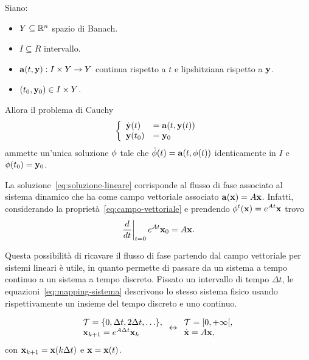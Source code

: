 \begin{thm}
    Siano:
    \begin{itemize}
        \item $Y \subseteq \mathbb{R}^n$ spazio di Banach.%
        \item $I \subseteq R$ intervallo.%
        \item $\mathbf{a}(t, \mathbf{y}) : I \times Y \to Y$ continua rispetto a $t$ e lipshitziana rispetto a $\mathbf{y}$.%
        \item $(t_0, \mathbf{y}_0) \in I \times Y$.
    \end{itemize}
    Allora il problema di Cauchy
    \begin{equation*}
        \left\{
            \begin{array}{ll}
                \dot{\mathbf{y}}(t) &= \mathbf{a}(t, \mathbf{y} (t)) \\
                \mathbf{y} (t_0) &= \mathbf{y}_0
            \end{array}
        \right.
    \end{equation*}
    ammette un'unica soluzione $\mathbf{\phi}$ tale che $\dot {\mathbf{\phi}}(t) = \mathbf{a}(t, \mathbf{\phi}(t))$
    identicamente in $I$ e $\mathbf{\phi}(t_0) = \mathbf{y}_0$.
    \label{thm:esistenza-unicità}
\end{thm}

La soluzione~\eqref{eq:soluzione-lineare}
corrisponde al flusso di fase associato al sistema dinamico che ha come campo vettoriale
associato $\mathbf{a}(\mathbf{x}) = A\mathbf{x}$.
Infatti, considerando la proprietà~\eqref{eq:campo-vettoriale} e prendendo
$\phi^t(\mathbf{x}) = e^{At} \mathbf{x}$ trovo
\begin{equation*}
        \left. \frac d{dt} \right|_{t=0} e^{At} \mathbf{x}_0 = A \mathbf{x}.
\end{equation*}


Questa possibilità di ricavare il flusso di fase partendo dal campo vettoriale per
sistemi lineari è utile, in quanto permette di passare da un sistema a tempo continuo
a un sistema a tempo discreto.
Fissato un intervallo di tempo $\Delta t$, le equazioni~\eqref{eq:mapping-sistema} descrivono lo stesso sistema fisico usando
rispettivamente un insieme del tempo discreto e uno continuo.

\begin{equation}
    \begin{array}{l}
        \mathcal T = \{0, \Delta t, 2\Delta t, \ldots\}, \\
        \mathbf{x}_{k+1} = e^{A \Delta t} \mathbf{x}_k
    \end{array}
        \leftrightarrow
    \begin{array}{l}
        \mathcal T = [0, +\infty [, \\
        \dot{\mathbf{x}} = A \mathbf{x},
    \end{array}
    \label{eq:mapping-sistema}
\end{equation}
con $\mathbf{x}_{k+1} = \mathbf{x}(k\Delta t)$ e $\mathbf{x} = \mathbf{x}(t)$.

